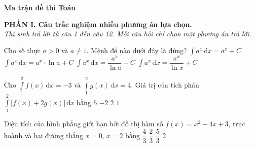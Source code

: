 \documentclass[12pt,a4paper]{article}
\begin{document}
\begin{center}
\noindent\textbf{\Large Ma trận đề thi Toán}
\end{center}
\vspace{0.5cm}

\begin{center}
\noindent\textbf{\large PHẦN I. Câu trắc nghiệm nhiều phương án lựa chọn.}
\\ \textit{Thí sinh trả lời từ câu 1 đến câu 12. Mỗi câu hỏi chỉ chọn một phương án trả lời.}
\end{center}
\setcounter{ex}{0}

\begin{ex}%
	Cho số thực $a>0$ và $a\neq 1$. Mệnh đề nào dưới đây là đúng?
	\choice
		{$\displaystyle \int a^x\mathrm{\,d}x =a^x+C$}
		{$\displaystyle \int a^x\mathrm{\,d}x =a^x\cdot \ln a+C$}
		{\True $\displaystyle \int a^x\mathrm{\,d}x =\dfrac{a^x}{\ln a}+C$}
		{$\displaystyle \int a^x\mathrm{\,d}x =\dfrac{a^x}{\ln x}+C$}
\end{ex}

\begin{ex}%
	Cho $\displaystyle \int\limits_1^2 f(x) \mathrm{\,d}x=-3$ và $\displaystyle \int\limits_1^2 g(x) \mathrm{\,d}x=4$. Giá trị của tích phân $\displaystyle \int\limits_1^2 \big[f(x)+2g(x)\big] \mathrm{\,d}x$ bằng
	\choice
		{\True $5$}
		{$-2$}
		{$2$}
		{$1$}
\end{ex}

\begin{ex}%
	Diện tích của hình phẳng giới hạn bởi đồ thị hàm số $f(x)=x^2-4x+3$, trục hoành và hai đường thẳng $x=0$, $x=2$ bằng
	\choice
		{$\dfrac{4}{3}$}
		{$\dfrac{2}{3}$}
		{$\dfrac{5}{3}$}
		{\True $2$}
\end{ex}
\end{document}
